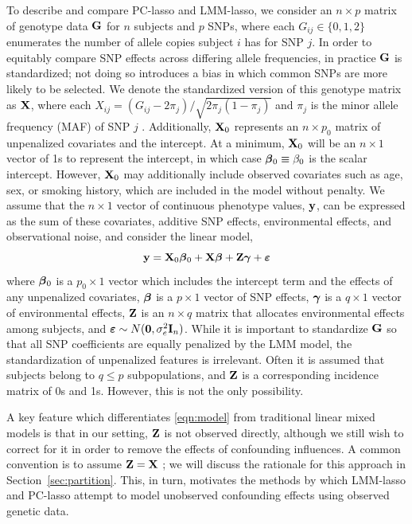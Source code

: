 To describe and compare PC-lasso and LMM-lasso, we consider an $n \times p$ matrix of genotype data $\mathbf{G}$ for $n$ subjects and $p$ SNPs, where each $G_{ij} \in \{ 0, 1, 2 \}$ enumerates the number of allele copies subject $i$ has for SNP $j$. In order to equitably compare SNP effects across differing allele frequencies, in practice $\mathbf{G}$ is standardized; not doing so introduces a bias in which common SNPs are more likely to be selected. We denote the standardized version of this genotype matrix as $\mathbf{X}$, where each $X_{ij} = (G_{ij} - 2 \pi_j) / \sqrt{2\pi_j (1 - \pi_j)}$ and $\pi_j$ is the minor allele frequency (MAF) of SNP $j$ \citep{zhang2015principal, price2006principal}. Additionally, $\mathbf{X}_0$ represents an $n \times p_0$ matrix of unpenalized covariates and the intercept. At a minimum, $\mathbf{X}_0$ will be an $n \times 1$ vector of 1s to represent the intercept, in which case $\boldsymbol{\beta}{}_0 \equiv \beta_0$ is the scalar intercept. However, $\mathbf{X}_0$ may additionally include observed covariates such as age, sex, or smoking history, which are included in the model without penalty. We assume that the $n \times 1$ vector of continuous phenotype values, $\mathbf{y}$, can be expressed as the sum of these covariates, additive SNP effects, environmental effects, and observational noise, and consider the linear model,
\begin{equation}
    \label{eqn:model}
    \mathbf{y} = \mathbf{X}_0 \boldsymbol{\beta}{}_0 + \mathbf{X}\boldsymbol{\beta}{} + \mathbf{Z}\boldsymbol{\gamma} + \boldsymbol{\varepsilon}{}
\end{equation}
where $\boldsymbol{\beta}{}_0$ is a $p_0 \times 1$ vector which includes the intercept term and the effects of any unpenalized covariates, $\boldsymbol{\beta}{}$ is a $p \times 1$ vector of SNP effects, $\boldsymbol{\gamma}$ is a $q \times 1$ vector of environmental effects, $\mathbf{Z}$ is an $n \times q$ matrix that allocates environmental effects among subjects, and $\boldsymbol{\varepsilon}{} \sim N(\boldsymbol{0}, \sigma^2_e \mathbf{I}_n)$. While it is important to standardize $\mathbf{G}$ so that all SNP coefficients are equally penalized by the LMM model, the standardization of unpenalized features is irrelevant. Often it is assumed that subjects belong to $q \le p$ subpopulations, and $\mathbf{Z}$ is a corresponding incidence matrix of 0s and 1s. However, this is not the only possibility. 

A key feature which differentiates \eqref{eqn:model} from traditional linear mixed models is that in our setting, $\mathbf{Z}$ is not observed directly, although we still wish to correct for it in order to remove the effects of confounding influences. A common convention is to assume $\mathbf{Z} = \mathbf{X}$ \citep{wang2018multiplex, lippert2011fast, yang2014advantages}; we will discuss the rationale for this approach in Section~\ref{sec:partition}.  This, in turn, motivates the methods by which LMM-lasso and PC-lasso attempt to model unobserved confounding effects using observed genetic data.

